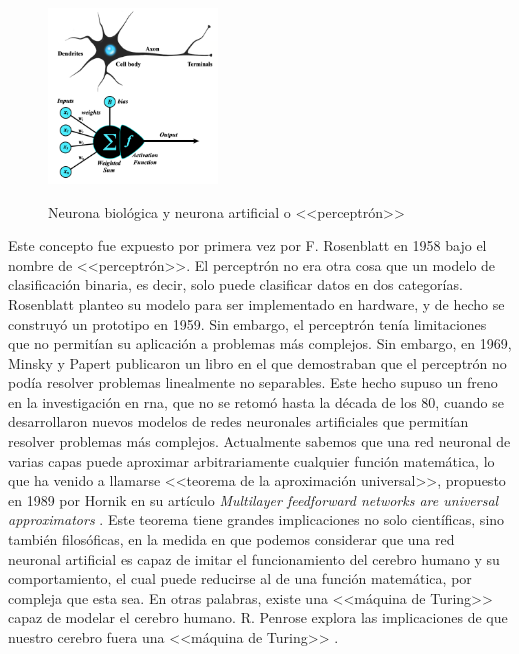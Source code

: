 \begin{figure}[H]
    \caption[Neurona biológica y neurona artificial o <<perceptrón>>]{Neurona biológica y neurona artificial o <<perceptrón>>}
    \centering
    \includegraphics[width=0.4\textwidth]{./figuras/perceptron_with_neuron.png}
    \label{fig:neurona_artificial_natural}
\end{figure}

Este concepto fue expuesto por primera vez por F. Rosenblatt en 1958 \citep{rothmanTransformersNaturalLanguage2021} bajo el nombre de <<perceptrón>>. El perceptrón no era otra cosa que un modelo de clasificación binaria, es decir, solo puede clasificar datos en dos categorías. Rosenblatt planteo su modelo para ser implementado en hardware, y de hecho se construyó un prototipo en 1959. Sin embargo, el perceptrón tenía limitaciones que no permitían su aplicación a problemas más complejos. Sin embargo, en 1969, Minsky y Papert publicaron un libro \citep{minsky1969perceptrons} en el que demostraban que el perceptrón no podía resolver problemas linealmente no separables. Este hecho supuso un freno en la investigación en \gls{rna}, que no se retomó hasta la década de los 80, cuando se desarrollaron nuevos modelos de redes neuronales artificiales que permitían resolver problemas más complejos. Actualmente sabemos que una red neuronal de varias capas puede aproximar arbitrariamente cualquier función matemática, lo que ha venido a llamarse <<teorema de la aproximación universal>>, propuesto en 1989 por Hornik en su artículo \textit{Multilayer feedforward networks are universal approximators} \citep{hornikMultilayerFeedforwardNetworks1989}. Este teorema tiene grandes implicaciones no solo científicas, sino también filosóficas, en la medida en que podemos considerar que una red neuronal artificial es capaz de imitar el funcionamiento del cerebro humano y su comportamiento, el cual puede reducirse al de una función matemática, por compleja que esta sea. En otras palabras, existe una <<máquina de Turing>> capaz de modelar el cerebro humano. R. Penrose explora las implicaciones de que nuestro cerebro fuera una <<máquina de Turing>> \citep{penroseNuevaMenteEmperador2015}.


